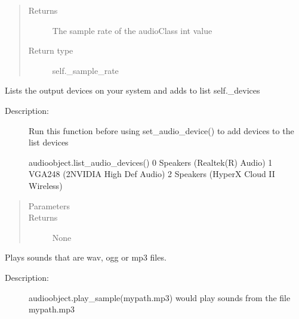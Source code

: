 \documentclass[letterpaper,10pt,english,openany,oneside]{sphinxmanual}
\begin{document}
\begin{fulllineitems}
\begin{fulllineitems}
\begin{quote}
\begin{description}
\item[{Returns}] \leavevmode
\sphinxAtStartPar
The sample rate of the audioClass \sphinxhyphen{} int value

\item[{Return type}] \leavevmode
\sphinxAtStartPar
self.\_sample\_rate

\end{description}\end{quote}

\end{fulllineitems}


\begin{fulllineitems}
\label{\detokenize{dpav:dpav.audio.Audio.list_audio_devices}}
\sphinxAtStartPar
Lists the output devices on your system and adds to list self.\_devices
\begin{description}
\item[{Description:}] \leavevmode
\sphinxAtStartPar
Run this function before using set\_audio\_device() to add devices to the list devices

\sphinxAtStartPar
audioobject.list\_audio\_devices()
0 Speakers (Realtek(R) Audio)
1 VGA248 (2\sphinxhyphen{}NVIDIA High Def Audio)
2 Speakers (HyperX Cloud II Wireless)

\end{description}
\begin{quote}\begin{description}
\item[{Parameters}] \leavevmode
\sphinxAtStartPar
{} \textendash{} 

\item[{Returns}] \leavevmode
\sphinxAtStartPar
None

\end{description}\end{quote}

\end{fulllineitems}


\begin{fulllineitems}
\label{\detokenize{dpav:dpav.audio.Audio.play_sample}}
\sphinxAtStartPar
Plays sounds that are wav, ogg or mp3 files.
\begin{description}
\item[{Description:}] \leavevmode
\sphinxAtStartPar
audioobject.play\_sample(mypath.mp3) would play sounds from the file mypath.mp3


\end{description}
\end{fulllineitems}
\end{fulllineitems}
\end{document}
